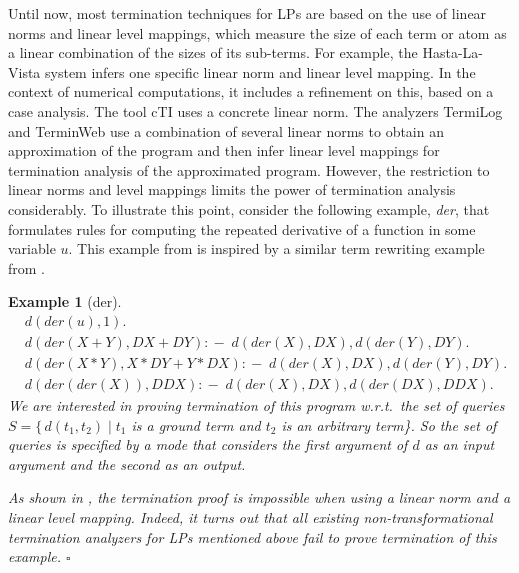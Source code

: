 \documentclass[envcountsame]{tlp}
\newcommand{\incase}{:\!\!-\;}
\newcounter{ex:der-lastsymconsctr}
\newtheorem{example}{Example}
\begin{document}
Until now, most termination techniques for LPs are based on the use of
linear
norms and linear level mappings,
which measure the size of each term or atom as a linear combination of the sizes of its
sub-terms. For example, the \textsf{Hasta-La-Vista} system
\cite{SerebrenikandDeSchreye03} 
infers one specific linear norm and linear level mapping. In the context of numerical
computations, it includes a refinement on this, based on a case analysis. 
The tool \textsf{cTI}
\cite{MesnardBagnara05} uses a concrete linear norm. The analyzers \textsf{TermiLog}
\cite{lindenstrauss97,Termilog} and \textsf{TerminWeb} \cite{Codishetal99,terminWeb02} use
a combination of several linear norms to obtain an
approximation of the program and then infer linear level mappings for termination
analysis of the approximated program. However, the
restriction to linear norms and level mappings limits the power of termination analysis
considerably. 
To
illustrate this point, consider the following example, \emph{der}, that formulates rules
for computing the repeated derivative of a function in some variable
$u$. This example from \cite{DeSchreyeSerebrenik01,NaomiWST97} is inspired by a
similar term rewriting example 
from \cite{Dershowitz95}.

\begin{example}[der]\label{exam:der}
\begin{align}
  &d(\mathit{der}(u),1). \label{der1} \\
  &d(\mathit{der}(X+Y),\mathit{DX}+\mathit{DY}) \incase d(\mathit{der}(X),\mathit{DX}),
d(\mathit{der}(Y),\mathit{DY}). \label{der2} \\ 
  &d(\mathit{der}(X*Y),X*\mathit{DY}+Y*\mathit{DX}) \incase
d(\mathit{der}(X),\mathit{DX}),d(\mathit{der}(Y),\mathit{DY}). \label{der3} \\ 
  &d(\mathit{der}(\mathit{der}(X)),\mathit{DDX}) \incase d(\mathit{der}(X),\mathit{DX}),
d(\mathit{der}(\mathit{DX}),\mathit{DDX}). \label{der4} 
\end{align}
We are interested in proving termination of this program w.r.t.\ the set of queries $S=\{\,
d(t_1,t_2) \mid t_1$ is a ground term and $t_2$ is an arbitrary term\}.  So
the set of queries is specified by a \emph{mode} that considers
the first argument of $d$ as an input argument and the second as an output.

As
shown in \cite{NaomiWST97,MNTDannyd05}, the termination proof is impossible when using
a linear norm and a linear level mapping. Indeed,
it turns out that all existing non-transformational termination analyzers for LPs
mentioned above fail to prove termination of this example.
{\hfill{$\square$}}
\end{example}
\end{document}
